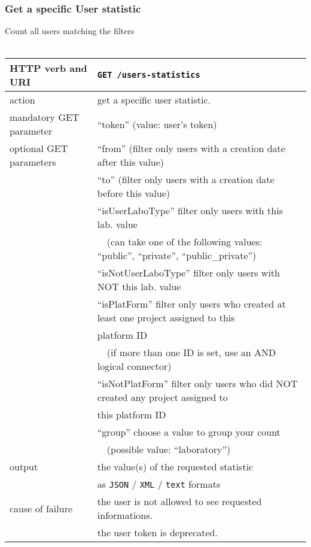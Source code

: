 \subsubsection{Get a specific User statistic}
\hspace*{\parindent}
Count all users matching the filters
\\~\\
\begin{tabular}{ | l | l | }
	\hline
	HTTP verb and URI & \texttt{GET /users-statistics} \\
	\hline
	action & get a specific user statistic. \\
	\hline
	mandatory GET parameter & ``token'' (value: user's token) \\
	\hline
	optional GET parameters & ``from'' (filter only users with a creation date after this value) \\
	\space & ``to'' (filter only users with a creation date before this value) \\
	\space & ``isUserLaboType'' filter only users with this lab. value \\
	\space & ~~(can take one of the following values: ``public'', ``private'', ``public\_private'') \\
	\space & ``isNotUserLaboType'' filter only users with NOT this lab. value \\
    \space & ``isPlatForm'' filter only users who created at least one project assigned to this \\
    \space & platform ID \\
	\space & ~~(if more than one ID is set, use an AND logical connector) \\
	\space & ``isNotPlatForm'' filter only users who did NOT created any project assigned to \\
	\space & this platform ID \\
	\space & ``group'' choose a value to group your count \\
	\space & ~~(possible value: ``laboratory'') \\
	\hline
	output & the value(s) of the requested statistic \\
	\space & as \texttt{JSON} / \texttt{XML} / \texttt{text} formats \\
	\hline
	cause of failure & the user is not allowed to see requested informations. \\
	\space & the user token is deprecated. \\
	\hline
\end{tabular}
\newline

